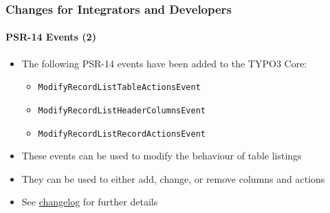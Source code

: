 %

\begin{frame}[fragile]
	\frametitle{Changes for Integrators and Developers}
	\framesubtitle{PSR-14 Events (2)}


	\begin{itemize}
		\item The following PSR-14 events have been added to the TYPO3 Core:
			\begin{itemize}
				\item \texttt{ModifyRecordListTableActionsEvent}
				\item \texttt{ModifyRecordListHeaderColumnsEvent}
				\item \texttt{ModifyRecordListRecordActionsEvent}
			\end{itemize}
		\item These events can be used to modify the behaviour of table listings
		\item They can be used to either add, change, or remove columns and actions
		\item See
			\href{https://docs.typo3.org/c/typo3/cms-core/master/en-us/Changelog/11.4/Feature-95105-NewPSR-14DatabaseRecordListEvents.html}{changelog}
			for further details

	\end{itemize}
\end{frame}

